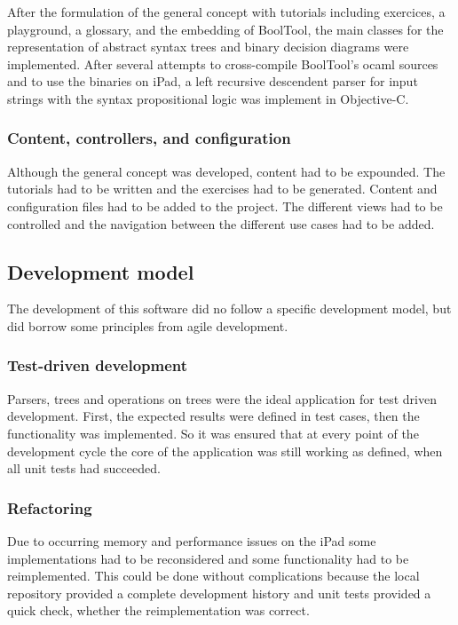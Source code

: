 
After the formulation of the general concept with tutorials including exercices, a playground, a glossary, and the embedding of BoolTool,
the main classes for the representation of abstract syntax trees and binary decision diagrams were implemented.
After several attempts to cross-compile BoolTool's ocaml sources and to use the binaries on iPad, a left recursive descendent parser for input strings with the syntax propositional logic was implement in Objective-C. 

\subsubsection{Content, controllers, and configuration}

Although the general concept was developed, content had to be expounded. 
The tutorials had to be written and the exercises had to be generated. 
Content and configuration files had to be added to the project. 
The different views had to be controlled and the navigation between the different use cases had to be added. 

\subsection{Development model}

The development of this software did no follow a specific development model, 
but did borrow some principles from agile development.

\subsubsection{Test-driven development}

Parsers, trees and operations on trees were the ideal application for test driven development.
First, the expected results were defined in test cases, then the functionality was implemented.
So it was ensured that at every point of the development cycle 
the core of the application was still working as defined,
when all unit tests had succeeded.


\subsubsection{Refactoring}

Due to occurring memory and performance issues on the iPad
some implementations had to be reconsidered 
and some functionality had to be reimplemented.
This could be done without complications because 
the local repository provided a complete development history 
and unit tests provided a quick check, whether the reimplementation was correct.


